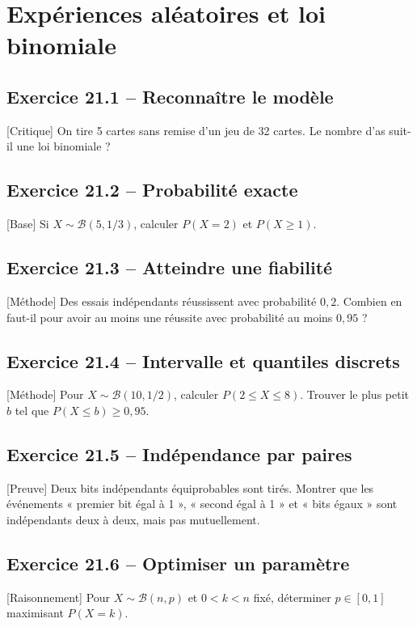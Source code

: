 \chapter{Expériences aléatoires et loi binomiale}
\section*{Exercice 21.1 -- Reconnaître le modèle}
[Critique] On tire 5 cartes sans remise d'un jeu de 32 cartes. Le nombre d'as suit-il une loi binomiale ?

\section*{Exercice 21.2 -- Probabilité exacte}
[Base] Si $X\sim\mathcal B(5,1/3)$, calculer $P(X=2)$ et $P(X\ge1)$.

\section*{Exercice 21.3 -- Atteindre une fiabilité}
[Méthode] Des essais indépendants réussissent avec probabilité $0{,}2$. Combien en faut-il pour avoir au moins une réussite avec probabilité au moins $0{,}95$ ?

\section*{Exercice 21.4 -- Intervalle et quantiles discrets}
[Méthode] Pour $X\sim\mathcal B(10,1/2)$, calculer $P(2\le X\le8)$. Trouver le plus petit $b$ tel que $P(X\le b)\ge0{,}95$.

\section*{Exercice 21.5 -- Indépendance par paires}
[Preuve] Deux bits indépendants équiprobables sont tirés. Montrer que les événements « premier bit égal à 1 », « second égal à 1 » et « bits égaux » sont indépendants deux à deux, mais pas mutuellement.

\section*{Exercice 21.6 -- Optimiser un paramètre}
[Raisonnement] Pour $X\sim\mathcal B(n,p)$ et $0<k<n$ fixé, déterminer $p\in[0,1]$ maximisant $P(X=k)$.
